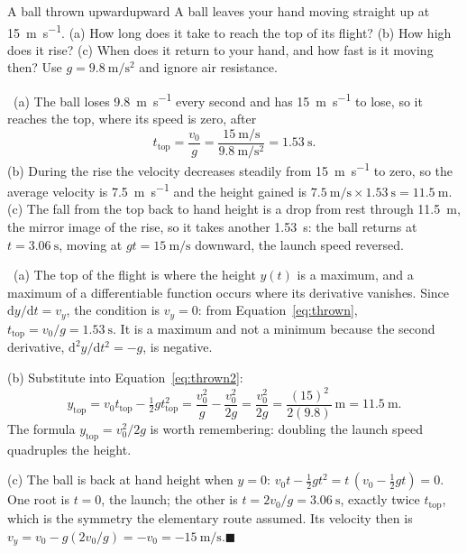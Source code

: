 \documentclass[11pt,twoside,openany]{book}
\newcommand{\dd}{\mathrm{d}}
\newcommand{\viewtag}[3]{\fcolorbox{#2}{#3}{\footnotesize\textbf{\textcolor{#2}{#1}}}}
\newcommand{\elemtag}{\viewtag{Elementary}{elemcol}{elempale}}
\newcommand{\calctag}{\viewtag{Calculus}{calccol}{calcpale}}
\newcommand{\elem}{\par\medskip\noindent\elemtag\ }
\newcommand{\calc}{\par\medskip\noindent\calctag\ }
\newcommand{\qed}{\hfill$\blacksquare$}
\begin{document}
\begin{example}{A ball thrown upward}{upward}
A ball leaves your hand moving straight up at \SI{15}{\metre\per\second}. (a) How long does it take to reach the top of its flight? (b) How high does it rise? (c) When does it return to your hand, and how fast is it moving then? Use $g = \SI{9.8}{\metre\per\second\squared}$ and ignore air resistance.

\elem (a) The ball loses \SI{9.8}{\metre\per\second} every second and has \SI{15}{\metre\per\second} to lose, so it reaches the top, where its speed is zero, after
\[
t_{\text{top}} = \frac{v_0}{g} = \frac{\SI{15}{\metre\per\second}}{\SI{9.8}{\metre\per\second\squared}} = \SI{1.53}{\second}.
\]
(b) During the rise the velocity decreases steadily from \SI{15}{\metre\per\second} to zero, so the average velocity is \SI{7.5}{\metre\per\second} and the height gained is $\SI{7.5}{\metre\per\second} \times \SI{1.53}{\second} = \SI{11.5}{\metre}$. (c) The fall from the top back to hand height is a drop from rest through \SI{11.5}{\metre}, the mirror image of the rise, so it takes another \SI{1.53}{\second}: the ball returns at $t = \SI{3.06}{\second}$, moving at $gt = \SI{15}{\metre\per\second}$ downward, the launch speed reversed.

\calc (a) The top of the flight is where the height $y(t)$ is a maximum, and a maximum of a differentiable function occurs where its derivative vanishes. Since $\dd y/\dd t = v_y$, the condition is $v_y = 0$: from Equation~\eqref{eq:thrown}, $t_{\text{top}} = v_0/g = \SI{1.53}{\second}$. It is a maximum and not a minimum because the second derivative, $\dd^2 y/\dd t^2 = -g$, is negative.

(b) Substitute into Equation~\eqref{eq:thrown2}:
\[
y_{\text{top}} = v_0 t_{\text{top}} - \tfrac12 g t_{\text{top}}^2 = \frac{v_0^2}{g} - \frac{v_0^2}{2g} = \frac{v_0^2}{2g} = \frac{(15)^2}{2(9.8)}\ \si{\metre} = \SI{11.5}{\metre}.
\]
The formula $y_{\text{top}} = v_0^2/2g$ is worth remembering: doubling the launch speed quadruples the height.

(c) The ball is back at hand height when $y = 0$: $v_0 t - \tfrac12 g t^2 = t\,(v_0 - \tfrac12 g t) = 0$. One root is $t = 0$, the launch; the other is $t = 2v_0/g = \SI{3.06}{\second}$, exactly twice $t_{\text{top}}$, which is the symmetry the elementary route assumed. Its velocity then is $v_y = v_0 - g(2v_0/g) = -v_0 = \SI{-15}{\metre\per\second}$.\qed
\end{example}
\end{document}
